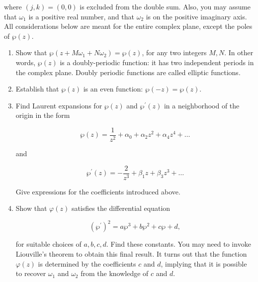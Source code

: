 \documentclass[10pt]{amsart}
\theoremstyle{nonumberplain}
\begin{document}
\begin{enumerate}[label={\bf {\arabic*}:}]
where $(j, k)=(0,0)$ is excluded from the double sum. Also, you may
assume that $\omega_1$ is a positive real number, and that $\omega_2$
is on the positive imaginary axis. All considerations below are meant
for the entire complex plane, except the poles of $\wp(z)$.
\begin{enumerate}
\item Show that $\wp\left(z+M \omega_1+N \omega_2\right)=\wp(z)$, for any two integers $M, N$. In other words, $\wp(z)$ is a doubly-periodic function: it has two independent periods in the complex plane. Doubly periodic functions are called elliptic functions.
\item Establish that $\wp(z)$ is an even function: $\wp(-z)=\wp(z)$.
\item Find Laurent expansions for $\wp(z)$ and $\wp^{\prime}(z)$ in a neighborhood of the origin in the form

$$
\wp(z)=\frac{1}{z^2}+\alpha_0+\alpha_2 z^2+\alpha_4 z^4+\ldots
$$

and

$$
\wp^{\prime}(z)=-\frac{2}{z^3}+\beta_1 z+\beta_3 z^3+\ldots
$$


Give expressions for the coefficients introduced above.
\item Show that $\varphi(z)$ satisfies the differential equation

$$
\left(\wp^{\prime}\right)^2=a \wp^3+b \wp^2+c \wp+d,
$$

for suitable choices of $a, b, c, d$. Find these constants. You may need to invoke Liouville's theorem to obtain this final result. It turns out that the function $\varphi(z)$ is determined by the coefficients $c$ and $d$, implying that it is possible to recover $\omega_1$ and $\omega_2$ from the knowledge of $c$ and $d$.
\end{enumerate}
\end{enumerate}
\end{document}
